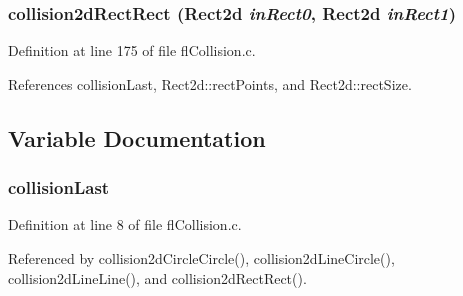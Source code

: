 \subsubsection{ collision2d\-Rect\-Rect ({\bf Rect2d} {\em in\-Rect0}, {\bf Rect2d} {\em in\-Rect1})}\label{flCollision_8c_0bc28bfeb7982182d0168423a6ae8b9c}




Definition at line 175 of file fl\-Collision.c.

References collision\-Last, Rect2d::rect\-Points, and Rect2d::rect\-Size.

\subsection{Variable Documentation}
\subsubsection{ {\bf collision\-Last}}\label{flCollision_8c_bd00ab8c248da82912ff1a8ca676cf86}




Definition at line 8 of file fl\-Collision.c.

Referenced by collision2d\-Circle\-Circle(), collision2d\-Line\-Circle(), collision2d\-Line\-Line(), and collision2d\-Rect\-Rect().